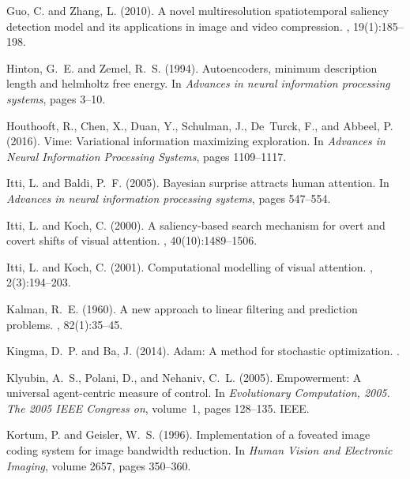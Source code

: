 \documentclass[12pt,twoside,openright]{article}
\begin{document}
\begin{thebibliography}{}
	Guo, C. and Zhang, L. (2010).
	\newblock A novel multiresolution spatiotemporal saliency detection model and
	its applications in image and video compression.
	, 19(1):185--198.
	
	Hinton, G.~E. and Zemel, R.~S. (1994).
	\newblock Autoencoders, minimum description length and helmholtz free energy.
	\newblock In {\em Advances in neural information processing systems}, pages
	3--10.
	
	Houthooft, R., Chen, X., Duan, Y., Schulman, J., De~Turck, F., and Abbeel, P.
	(2016).
	\newblock Vime: Variational information maximizing exploration.
	\newblock In {\em Advances in Neural Information Processing Systems}, pages
	1109--1117.
	
	Itti, L. and Baldi, P.~F. (2005).
	\newblock Bayesian surprise attracts human attention.
	\newblock In {\em Advances in neural information processing systems}, pages
	547--554.
	
	Itti, L. and Koch, C. (2000).
	\newblock A saliency-based search mechanism for overt and covert shifts of
	visual attention.
	, 40(10):1489--1506.
	
	Itti, L. and Koch, C. (2001).
	\newblock Computational modelling of visual attention.
	, 2(3):194--203.
	
	Kalman, R.~E. (1960).
	\newblock A new approach to linear filtering and prediction problems.
	, 82(1):35--45.
	
	Kingma, D.~P. and Ba, J. (2014).
	\newblock Adam: A method for stochastic optimization.
	.
	
	Klyubin, A.~S., Polani, D., and Nehaniv, C.~L. (2005).
	\newblock Empowerment: A universal agent-centric measure of control.
	\newblock In {\em Evolutionary Computation, 2005. The 2005 IEEE Congress on},
	volume~1, pages 128--135. IEEE.
	
	Kortum, P. and Geisler, W.~S. (1996).
	\newblock Implementation of a foveated image coding system for image bandwidth
	reduction.
	\newblock In {\em Human Vision and Electronic Imaging}, volume 2657, pages
	350--360.
	

\end{thebibliography}
\end{document}
